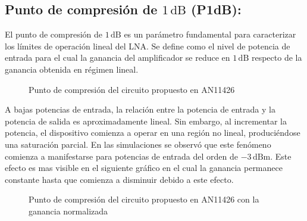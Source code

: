 \subsection{Punto de compresión de $1\,\text{dB}$ (P1dB):}
El punto de compresión de $1\,\text{dB}$ es un parámetro fundamental para caracterizar los límites de operación lineal del LNA. Se define como el nivel de potencia de entrada para el cual la ganancia del amplificador se reduce en $1\,\text{dB}$ respecto de la ganancia obtenida en régimen lineal.
\begin{figure}[htbp]
\centering
{}
\caption{Punto de compresión del circuito propuesto en AN11426}
\label{fig:nf_vs_freq}
\end{figure}
A bajas potencias de entrada, la relación entre la potencia de entrada y la potencia de salida es aproximadamente lineal. Sin embargo, al incrementar la potencia, el dispositivo comienza a operar en una región no lineal, produciéndose una saturación parcial. En las simulaciones se observó que este fenómeno comienza a manifestarse para potencias de entrada del orden de $-3\,\text{dBm}$.
Este efecto es mas visible en el siguiente gráfico en el cual la ganancia permanece constante hasta que comienza a disminuir debido a este efecto.
\begin{figure}[htbp]
\centering
{}
\caption{Punto de compresión del circuito propuesto en AN11426
con la ganancia normalizada}
\label{fig:nf_vs_freq}
\end{figure}


